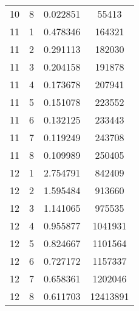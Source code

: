\documentclass{article}
\begin{document}
\begin{table}[h!]
\begin{center}
\begin{tabular}{c|c|c|c}
10 & 8 & 0.022851 & 55413\\
11 & 1 & 0.478346 & 164321\\
11 & 2 & 0.291113 & 182030\\
11 & 3 & 0.204158 & 191878\\
11 & 4 & 0.173678 & 207941\\
11 & 5 & 0.151078 & 223552\\
11 & 6 & 0.132125 & 233443\\
11 & 7 & 0.119249 & 243708\\
11 & 8 & 0.109989 & 250405\\
12 & 1 & 2.754791 & 842409\\
12 & 2 & 1.595484 & 913660\\
12 & 3 & 1.141065 & 975535\\
12 & 4 & 0.955877 & 1041931\\
12 & 5 & 0.824667 & 1101564\\
12 & 6 & 0.727172 & 1157337\\
12 & 7 & 0.658361 & 1202046\\
12 & 8 & 0.611703 & 12413891\\
    \end{tabular}
  \end{center}
\end{table}
\end{document}
